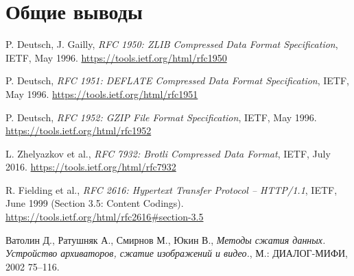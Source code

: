 \documentclass[12pt]{article}
\begin{document}
\section{Общие выводы}

\begin{thebibliography}{9}
    P. Deutsch, J. Gailly,
    \textit{RFC 1950: ZLIB Compressed Data Format Specification},
    IETF, May 1996.
    \url{https://tools.ietf.org/html/rfc1950}

    P. Deutsch,
    \textit{RFC 1951: DEFLATE Compressed Data Format Specification},
    IETF, May 1996.
    \url{https://tools.ietf.org/html/rfc1951}

    P. Deutsch,
    \textit{RFC 1952: GZIP File Format Specification},
    IETF, May 1996.
    \url{https://tools.ietf.org/html/rfc1952}

    L. Zhelyazkov et al.,
    \textit{RFC 7932: Brotli Compressed Data Format},
    IETF, July 2016.
    \url{https://tools.ietf.org/html/rfc7932}

    R. Fielding et al.,
    \textit{RFC 2616: Hypertext Transfer Protocol -- HTTP/1.1},
    IETF, June 1999 (Section 3.5: Content Codings).
    \url{https://tools.ietf.org/html/rfc2616#section-3.5}

    Ватолин Д., Ратушняк А., Смирнов М., Юкин В.,
    \textit{Методы сжатия данных. Устройство архиваторов, сжатие изображений и видео.},
     М.: ДИАЛОГ-МИФИ, 2002 75--116.

\end{thebibliography}
\end{document}
